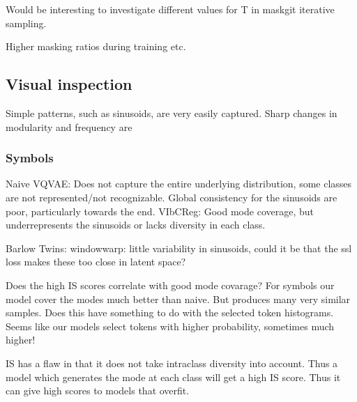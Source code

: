 \documentclass[../../thesis.tex]{subfiles}
\begin{document}

Would be interesting to investigate different values for T in maskgit iterative sampling.


Higher masking ratios during training etc.

\subsection{Visual inspection}
\label{section:Visual inspection}
Simple patterns, such as sinusoids, are very easily captured. Sharp changes in modularity and frequency are 

\subsubsection{Symbols}

Naive VQVAE: Does not capture the entire underlying distribution, some classes are not represented/not recognizable. Global consistency for the sinusoids are poor, particularly towards the end.
 \newline
VIbCReg: Good mode coverage, but underrepresents the sinusoids or lacks diversity in each class. 

Barlow Twins: windowwarp: little variability in sinusoids, could it be that the ssl loss makes these too close in latent space?

Does the high IS scores correlate with good mode covarage? For symbols our model cover the modes much better than naive. But produces many very similar samples. Does this have something to do with the selected token histograms. Seems like our models select tokens with higher probability, sometimes much higher!\newline

IS has a flaw in that it does not take intraclass diversity into account. Thus a model which generates the mode at each class will get a high IS score. Thus it can give high scores to models that overfit.  
\end{document}
